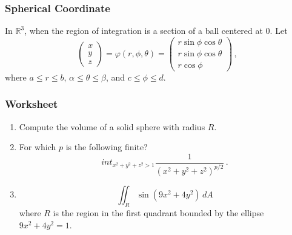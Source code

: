 \documentclass[aspectratio=169]{beamer}
\newcommand{\R}{\mathbb{R}}
\begin{document}
\begin{frame}
    \frametitle{Spherical Coordinate}
    In $\R^3$, when the region of integration is a section of a ball centered at $0$.
    Let
    \begin{equation*}
        \begin{pmatrix}
            x \\ y \\z
        \end{pmatrix}
        =
        \varphi(r,\phi,\theta) = 
        \begin{pmatrix}
            r\sin\phi\cos\theta\\
            r\sin\phi\cos\theta\\
            r \cos\phi
        \end{pmatrix} \,,
    \end{equation*}
    where $ a \leq r \leq b$, $\alpha \leq \theta \leq \beta$, and 
    $c \leq \phi \leq d$.
\end{frame}

\begin{frame}
    \frametitle{Worksheet}
    \begin{enumerate}
        \item Compute the volume of a solid sphere with radius $R$.
        \item For which $p$ is the following finite?
            \begin{equation*}
                int_{x^2 + y^2 + z^2 > 1} \frac{1}{(x^2 + y^2 + z^2)^{p/2}} \,.
            \end{equation*}
        \item 
            \begin{equation*}
                \iint_R \sin(9x^2 + 4y^2) \, dA
            \end{equation*}
            where $R$ is the region in the first quadrant bounded
            by the ellipse $9x^2 + 4y^2 = 1$.
    \end{enumerate}
\end{frame}
\end{document}

